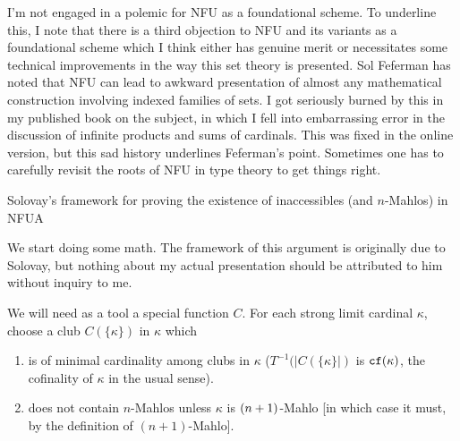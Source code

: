 \documentclass{slides}
\begin{document}
\begin{slide}

I'm not engaged in a polemic for NFU as a foundational scheme.  To underline this, I note that there is a third objection to NFU and its variants as a foundational scheme which I think either has genuine merit or necessitates some technical improvements in the way this set theory is presented.  Sol Feferman has noted that NFU can lead to awkward presentation of almost any mathematical construction involving indexed families of sets.  I got seriously burned by this in my published book on the subject, in which I fell into embarrassing error in the discussion of infinite products and sums of cardinals.  This was fixed in the online version, but this sad history underlines Feferman's point.  Sometimes one has to carefully revisit the roots of NFU in type theory to get things right.

\end{slide}

\begin{slide}

{\Large Solovay's framework for proving the existence of inaccessibles (and $n$-Mahlos) in NFUA}

We start doing some math.  The framework of this argument is originally due to Solovay, but nothing about my actual presentation should be attributed to him without inquiry to me.

We will need as a tool a special function $C$.  For each strong limit cardinal $\kappa$, choose a club $C(\{\kappa\})$ in $\kappa$ which 

\begin{enumerate}

\item is of minimal cardinality among clubs in $\kappa$ ($T^{-1}(|C(\{\kappa\}|)$ is ${\mbox{\tt cf}(\kappa)}$, the cofinality of $\kappa$ in the usual sense).

\item does not contain $n$-Mahlos unless $\kappa$ is ${\mbox (n+1)}$-Mahlo [in which case it must, by the definition of $(n+1)$-Mahlo].

\end{enumerate}


\end{slide}
\end{document}

